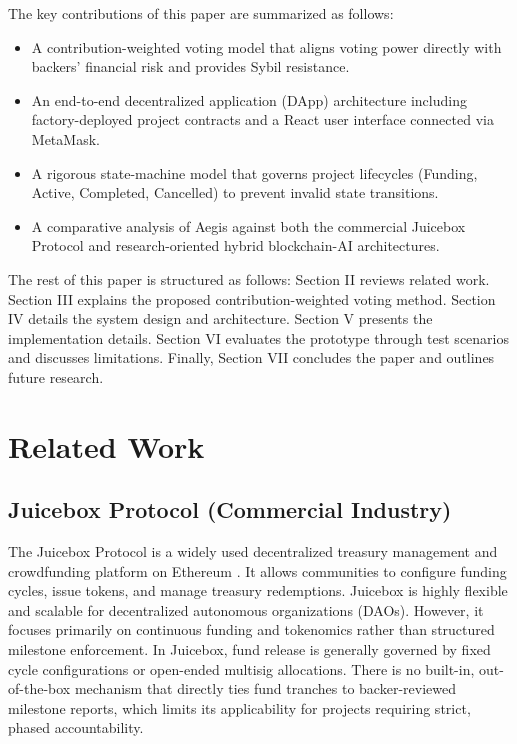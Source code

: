 \documentclass[conference]{IEEEtran}
\begin{document}
The key contributions of this paper are summarized as follows:
\begin{itemize}
	\item A contribution-weighted voting model that aligns voting power directly with backers' financial risk and provides Sybil resistance.
	\item An end-to-end decentralized application (DApp) architecture including factory-deployed project contracts and a React user interface connected via MetaMask.
	\item A rigorous state-machine model that governs project lifecycles (Funding, Active, Completed, Cancelled) to prevent invalid state transitions.
	\item A comparative analysis of Aegis against both the commercial Juicebox Protocol and research-oriented hybrid blockchain-AI architectures.
\end{itemize}

The rest of this paper is structured as follows: Section II reviews related work. Section III explains the proposed contribution-weighted voting method. Section IV details the system design and architecture. Section V presents the implementation details. Section VI evaluates the prototype through test scenarios and discusses limitations. Finally, Section VII concludes the paper and outlines future research.

\section{Related Work}

\subsection{Juicebox Protocol (Commercial Industry)}
The Juicebox Protocol is a widely used decentralized treasury management and crowdfunding platform on Ethereum \cite{juicebox}. It allows communities to configure funding cycles, issue tokens, and manage treasury redemptions. Juicebox is highly flexible and scalable for decentralized autonomous organizations (DAOs). However, it focuses primarily on continuous funding and tokenomics rather than structured milestone enforcement. In Juicebox, fund release is generally governed by fixed cycle configurations or open-ended multisig allocations. There is no built-in, out-of-the-box mechanism that directly ties fund tranches to backer-reviewed milestone reports, which limits its applicability for projects requiring strict, phased accountability.
\end{document}
